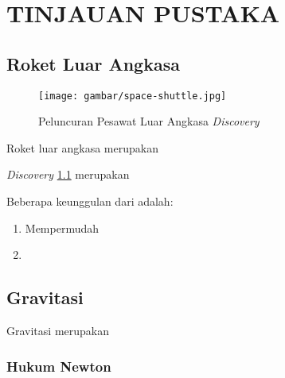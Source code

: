 \chapter{TINJAUAN PUSTAKA}
\vspace{4ex}

\setlength{\parindent}{7ex}

\section{Roket Luar Angkasa}
\vspace{1ex}

\begin{figure} [ht] \centering
	\texttt{[image: gambar/space-shuttle.jpg]}
	\caption{Peluncuran Pesawat Luar Angkasa \emph{Discovery}}
	\label{fig:spaceShuttle}
\end{figure}

Roket luar angkasa merupakan \lipsum[1]
\vspace{0.5ex}

\emph{Discovery} \ref{fig:spaceShuttle} merupakan \lipsum[2]

Beberapa keunggulan dari \lipsum[3][1-2] adalah:
\vspace{0.5ex}

\begin{enumerate}[nolistsep]

  \item Mempermudah \lipsum[1][1-2]
  \vspace{0.5ex}

  \item \lipsum[1][3-4]
  \vspace{0.5ex}

\end{enumerate}
\vspace{0.5ex}

\section{Gravitasi}
\vspace{1ex}

Gravitasi merupakan \lipsum[1]
\vspace{0.5ex}

\subsection{Hukum Newton}
\vspace{1ex}

